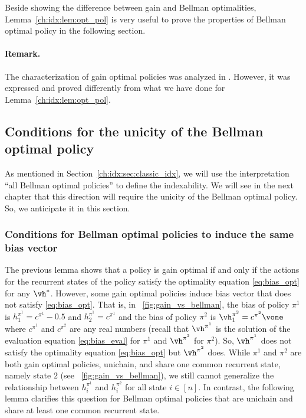Beside showing the difference between gain and Bellman optimalities, Lemma~\ref{ch:idx:lem:opt_pol} is very useful to prove the properties of Bellman optimal policy in the following section.

\paragraph{Remark.} The characterization of gain optimal policies was analyzed in \cite{puterman2014markov, schweitzer1978functional}.
However, it was expressed and proved differently from what we have done for Lemma~\ref{ch:idx:lem:opt_pol}.

\subsection{Conditions for the unicity of the Bellman optimal policy}
\label{ch:idx:ssec:unicity_bell}

As mentioned in Section~\ref{ch:idx:sec:classic_idx}, we will use the interpretation ``all Bellman optimal policies'' to define the indexability.
We will see in the next chapter that this direction will require the unicity of the Bellman optimal policy.
So, we anticipate it in this section.

\subsubsection{Conditions for Bellman optimal policies to induce the same bias vector}

The previous lemma shows that a policy is gain optimal if and only if the actions for the recurrent states of the policy satisfy the optimality equation \eqref{eq:bias_opt} for any $\vh^*$.
However, some gain optimal policies induce bias vector that does not satisfy \eqref{eq:bias_opt}.
That is, in \figurename~\ref{fig:gain_vs_bellman}, the bias of policy $\pi^1$ is $h^{\pi^1}_1=c^{\pi^1}-0.5$ and $h^{\pi^1}_2=c^{\pi^1}$ and the bias of policy $\pi^2$ is $\vh^{\pi^2}_1=c^{\pi^2}\vone$ where $c^{\pi^1}$ and $c^{\pi^2}$ are any real numbers (recall that $\vh^{\pi^1}$ is the solution of the evaluation equation \eqref{eq:bias_eval} for $\pi^1$ and $\vh^{\pi^2}$ for $\pi^2$).
So, $\vh^{\pi^1}$ does not satisfy the optimality equation \eqref{eq:bias_opt} but $\vh^{\pi^2}$ does.
While $\pi^1$ and $\pi^2$ are both gain optimal policies, unichain, and share one common recurrent state, namely state $2$ (see \figurename~\ref{fig:gain_vs_bellman}), we still cannot generalize the relationship between $h^{\pi^1}_i$ and $h^{\pi^2}_i$ for all state $i\in[n]$.
In contrast, the following lemma clarifies this question for Bellman optimal policies that are unichain and share at least one common recurrent state.


